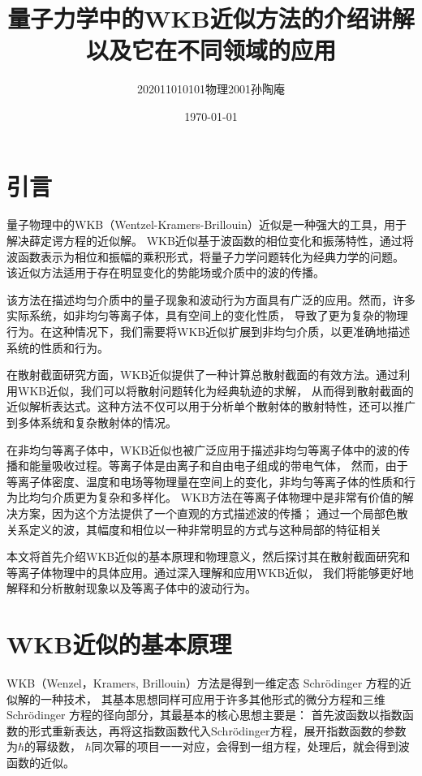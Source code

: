 \documentclass[12pt, a4paper, oneside]{ctexart}
\title{量子力学中的WKB近似方法的介绍讲解以及它在不同领域的应用}
\date{\today}
\author{202011010101物理2001孙陶庵}
\begin{document}
\begin{spacing}{2.0}
\tableofcontents
\maketitle

\section{引言}
量子物理中的WKB（Wentzel-Kramers-Brillouin）近似是一种强大的工具，用于解决薛定谔方程的近似解。
WKB近似基于波函数的相位变化和振荡特性，通过将波函数表示为相位和振幅的乘积形式，将量子力学问题转化为经典力学的问题。
该近似方法适用于存在明显变化的势能场或介质中的波的传播。

该方法在描述均匀介质中的量子现象和波动行为方面具有广泛的应用。然而，许多实际系统，如非均匀等离子体，具有空间上的变化性质，
导致了更为复杂的物理行为。在这种情况下，我们需要将WKB近似扩展到非均匀介质，以更准确地描述系统的性质和行为。

在散射截面研究方面，WKB近似提供了一种计算总散射截面的有效方法。通过利用WKB近似，我们可以将散射问题转化为经典轨迹的求解，
从而得到散射截面的近似解析表达式。这种方法不仅可以用于分析单个散射体的散射特性，还可以推广到多体系统和复杂散射体的情况。

在非均匀等离子体中，WKB近似也被广泛应用于描述非均匀等离子体中的波的传播和能量吸收过程。等离子体是由离子和自由电子组成的带电气体，
然而，由于等离子体密度、温度和电场等物理量在空间上的变化，非均匀等离子体的性质和行为比均匀介质更为复杂和多样化。
WKB方法在等离子体物理中是非常有价值的解决方案，因为这个方法提供了一个直观的方式描述波的传播；
通过一个局部色散关系定义的波，其幅度和相位以一种非常明显的方式与这种局部的特征相关

本文将首先介绍WKB近似的基本原理和物理意义，然后探讨其在散射截面研究和等离子体物理中的具体应用。通过深入理解和应用WKB近似，
我们将能够更好地解释和分析散射现象以及等离子体中的波动行为。


\section{WKB近似的基本原理}
WKB（Wenzel，Kramers, Brillouin）方法是得到一维定态 Schrödinger 方程的近似解的一种技术，
其基本思想同样可应用于许多其他形式的微分方程和三维 Schrödinger 方程的径向部分，其最基本的核心思想主要是：
首先波函数以指数函数的形式重新表达，再将这指数函数代入Schrödinger方程，展开指数函数的参数为$\hbar$的幂级数，
$\hbar$同次幂的项目一一对应，会得到一组方程，处理后，就会得到波函数的近似。

\end{spacing}
\end{document}
